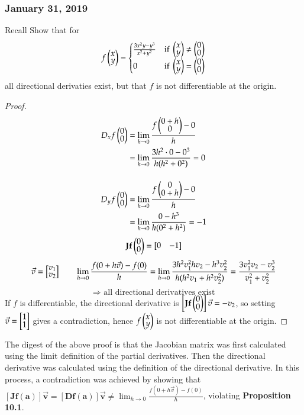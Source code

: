 \subsubsection*{January 31, 2019}

Recall
  Show that for
  \[f\Point{x \\ y} = \begin{cases}
   \frac{3x^2y - y^3}{x^2+y^2} & \text{if } \def\arraystretch{0.7}\Point{x \\ y} \neq \Point{0 \\ 0} \\
  0 & \text{if } \def\arraystretch{0.7}\Point{x \\ y} = \Point{0 \\ 0}
  \end{cases}\]
  all directional derivaties exist, but that $f$ is not differentiable at the origin.
  
\begin{proof}
\begin{align*}
  D_xf\Point{0 \\ 0} &= \lim_{h\to 0} \frac{f\Point{0 + h \\ 0}-0}{h} \\
  &= \lim_{h\to 0}\frac{3h^2\cdot 0 - 0^3}{h(h^2+0^2)}=0\\[12pt]
  D_yf\Point{0 \\ 0} &= \lim_{h\to 0} \frac{f\Point{0 \\ 0+h}-0}{h} \\
&= \lim_{h\to 0} \frac{0-h^3}{h(0^2+h^2)}=-1
\end{align*}
\[\bm{Jf}\Point{0 \\ 0} = \mtrx{0 & -1}\]
\[\vec{v}=\mtrx{v_1 \\ v_2}\qquad \lim_{h\to 0}\frac{f(0+h\vec{v})-f(0)}{h}=\lim_{h\to 0}\frac{3h^2v_1^2hv_2-h^3v_2^2}{h(h^2v_1+h^2 v_2^2)}=\frac{3v_1^2v_2-v_2^3}{v_1^2+v_2^2}\]
\[\Rightarrow \text{ all directional derivatives exist}\]
If $f$ is differentiable, the directional derivative is $\left[\bm{Jf}\Point{0 \\ 0}\right]\vec{v}=-v_2$, so setting $\vec{v}=\mtrx{1 \\ 1}$ gives a contradiction, hence $f\Point{x \\ y}$ is not differentiable at the origin.
\end{proof}

The digest of the above proof is that the Jacobian matrix was first calculated using the limit definition of the partial derivatives. Then the directional derivative was calculated using the definition of the directional derivative. In this process, a contradiction was achieved by showing that $[\bm{Jf}(\bm{a})]\vec{\bm{v}}=[\bm{Df}(\bm{a})]\vec{\bm{v}}\neq \lim_{h\to 0}\frac{f(0+h\vec{v})-f(0)}{h}$, violating \textbf{Proposition 10.1}. 

